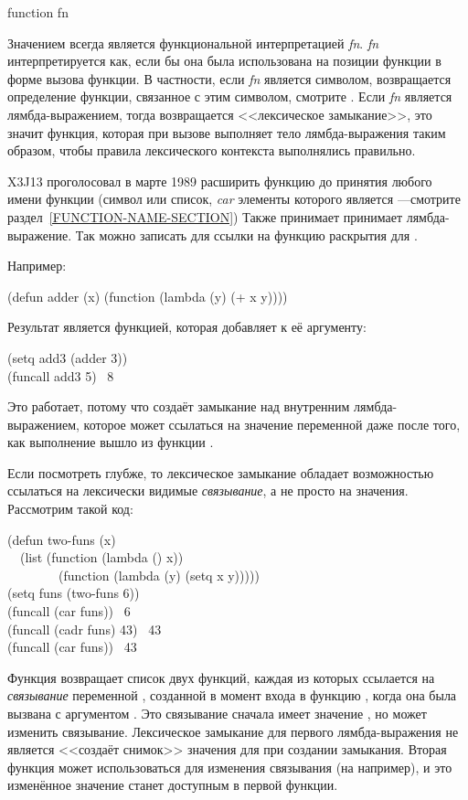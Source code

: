 \begin{defspec}
function fn

Значением  всегда является функциональной интерпретацией
\emph{fn}. \emph{fn} интерпретируется как, если бы она была использована на
позиции функции в форме вызова функции.
В частности, если \emph{fn} является символом, возвращается определение функции,
связанное с этим символом, смотрите .
Если \emph{fn} является лямбда-выражением, тогда возвращается <<лексическое
замыкание>>, это значит функция, которая при вызове выполняет тело
лямбда-выражения таким образом, чтобы правила лексического контекста выполнялись 
правильно.

\begin{newer}
X3J13 проголосовал в марте 1989 
расширить функцию 
до принятия любого имени функции (символ или список,
\emph{car} элементы которого является ---смотрите раздел~\ref{FUNCTION-NAME-SECTION})
Также принимает принимает лямбда-выражение.
Так можно записать  для ссылки на функцию раскрытия
 для .
\end{newer}

Например:
\begin{lisp}
(defun adder (x) (function (lambda (y) (+ x y))))
\end{lisp}
Результат  является функцией, которая добавляет  к её
аргументу:
\begin{lisp}
(setq add3 (adder 3)) \\
(funcall add3 5) \EV\ 8
\end{lisp}
Это работает, потому что  создаёт замыкание над внутренним
лямбда-выражением, которое может ссылаться на значение  переменной 
даже после того, как выполнение вышло из функции .

Если посмотреть глубже, то лексическое замыкание обладает возможностью ссылаться
на лексически видимые \emph{связывание}, а не просто на значения.
Рассмотрим такой код:
\begin{lisp}
(defun two-funs (x) \\
~~(list (function (lambda () x)) \\
~~~~~~~~(function (lambda (y) (setq x y))))) \\
(setq funs (two-funs 6)) \\
(funcall (car funs)) \EV\ 6 \\
(funcall (cadr funs) 43) \EV\ 43 \\
(funcall (car funs)) \EV\ 43
\end{lisp}
Функция  возвращает список двух функций, каждая из которых
ссылается на \emph{связывание} переменной , созданной в момент входа в
функцию , когда она была вызвана с аргументом .
Это связывание сначала имеет значение , но  может изменить
связывание. Лексическое замыкание для первого лямбда-выражения не является
<<создаёт снимок>> значения  для  при создании замыкания. Вторая
функция может использоваться для изменения связывания (на  например), и
это изменённое значение станет доступным в первой функции.


\end{defspec}
